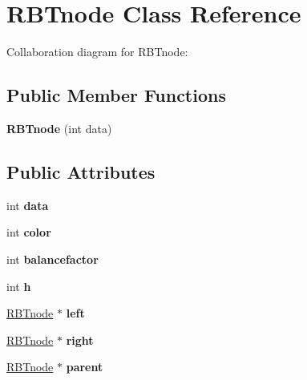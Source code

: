 \hypertarget{classRBTnode}{}\section{R\+B\+Tnode Class Reference}
\label{classRBTnode}


Collaboration diagram for R\+B\+Tnode\+:
\subsection*{Public Member Functions}
\begin{DoxyCompactItemize}
\item 
\mbox{\label{classRBTnode_a944c595a43a8ae574d80048935ffdca1}} 
{\bfseries R\+B\+Tnode} (int data)
\end{DoxyCompactItemize}
\subsection*{Public Attributes}
\begin{DoxyCompactItemize}
\item 
\mbox{\label{classRBTnode_aa935b7a6203662a311c2013c72b08326}} 
int {\bfseries data}
\item 
\mbox{\label{classRBTnode_a5c7764e517c6de5cb6f7d0face185e41}} 
int {\bfseries color}
\item 
\mbox{\label{classRBTnode_a6025f27c8d5799f0aaa758a90460e546}} 
int {\bfseries balancefactor}
\item 
\mbox{\label{classRBTnode_a165102d536657dba50c76222bea3a983}} 
int {\bfseries h}
\item 
\mbox{\label{classRBTnode_a50668587b4af9665b8d57d81012fb3ae}} 
\hyperlink{classRBTnode}{R\+B\+Tnode} $\ast$ {\bfseries left}
\item 
\mbox{\label{classRBTnode_af9249c58f13631f3047f7159b64df92c}} 
\hyperlink{classRBTnode}{R\+B\+Tnode} $\ast$ {\bfseries right}
\item 
\mbox{\label{classRBTnode_aab89bccaf5fd661a1451f921e479fb92}} 
\hyperlink{classRBTnode}{R\+B\+Tnode} $\ast$ {\bfseries parent}
\end{DoxyCompactItemize}



